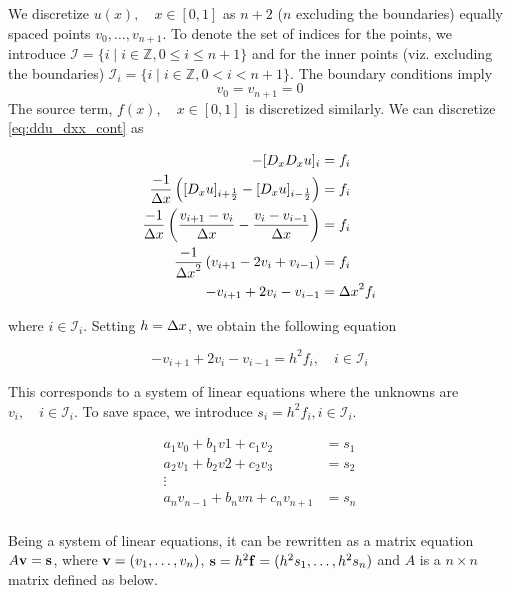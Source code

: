 \documentclass[a4paper]{article}
\begin{document}
We discretize $u(x), \quad x \in [0, 1]$ as $n+2$ ($n$ excluding the boundaries) equally spaced points $v_0, \dots, v_{n+1}$. To denote the set of indices for the points, we introduce $\mathcal{I} = \{ i \mid i \in \mathbb{Z}, 0 \leq i \leq n + 1\}$ and for the inner points (viz. excluding the boundaries) $\mathcal{I}_i = \{ i \mid i \in \mathbb{Z}, 0 < i < n + 1\}$.
The boundary conditions imply
\begin{equation}
v_0 = v_{n+1} = 0
\label{eq:boundaries_disc}
\end{equation}
The source term, $f(x), \quad x \in [0, 1]$ is discretized similarly. We can discretize \eqref{eq:ddu_dxx_cont} as

\begin{align*}
-[D_x D_x u]_i &= f_i \\
\frac{-1}{{\Delta x}} \left( [D_x u]_{i+\frac{1}{2}} - [D_x u]_{i-\frac{1}{2}} \right) &= f_i \\
\frac{-1}{{\Delta x}} \left( \frac{v_{i+1} - v_{i}}{{\Delta x}} - \frac{v_{i} - v_{i-1}}{{\Delta x}} \right) &= f_i \\
\frac{-1}{{\Delta x}^2} \left( v_{i+1} - 2v_{i} + v_{i-1} \right) &= f_i \\
-v_{i+1} + 2v_{i} - v_{i-1}  &= {\Delta x}^2 f_i
\end{align*}

where $i \in \mathcal{I}_i$. Setting $h = {\Delta x}$, we obtain the following equation

\begin{equation}
-v_{i+1} + 2v_{i} - v_{i-1}  = h^2 f_i, \quad i \in \mathcal{I}_i
\label{ddu_dxx_disc}
\end{equation}

This corresponds to a system of linear equations where the unknowns are $v_i, \quad i \in \mathcal{I}_i$. To save space, we introduce $s_i = h^2 f_i, i \in \mathcal{I}_i$.

\begin{equation}
    \begin{array}{cccc}
        a_1 v_{0} + b_1 v{1} + c_1 v_{2} &= s_1 \\
        a_2 v_{1} + b_2 v{2} + c_2 v_{3} &= s_2 \\
        \vdots \\
        a_n v_{n-1} + b_n v{n} + c_n v_{n+1} &= s_n \\
    \end{array}
\end{equation}

Being a system of linear equations, it can be rewritten as a matrix equation $A {\bf v} = {\bf s}$, where ${\bf v} = (v_1, \dots, v_{n})$, ${\bf s} = h^2 {\bf f} = (h^2 s_1, \dots, h^2 s_{n})$ and $A$ is a $n \times n$ matrix defined as below.
\end{document}

